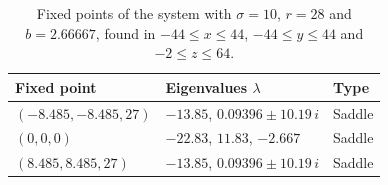 \begin{table}
\centering
\caption{Fixed points of the system with $\sigma = 10$, $r = 28$ and $b = 2.66667$, found in $-44 \le x \le 44$, $-44 \le y \le 44$ and $-2 \le z \le 64$.}
\label{tab:lorenz-equations-fixed-points}
\begin{tabular}{@{}lll@{}}
\toprule
Fixed point & Eigenvalues $\lambda$ & Type \\
\midrule
$(\num{-8.485}, \num{-8.485}, \num{27})$ & $\num{-13.85}$, $\num{0.09396} \pm \num{10.19}\,i$ & Saddle \\
$(\num{0}, \num{0}, \num{0})$ & $\num{-22.83}$, $\num{11.83}$, $\num{-2.667}$ & Saddle \\
$(\num{8.485}, \num{8.485}, \num{27})$ & $\num{-13.85}$, $\num{0.09396} \pm \num{10.19}\,i$ & Saddle \\
\bottomrule
\end{tabular}
\end{table}
